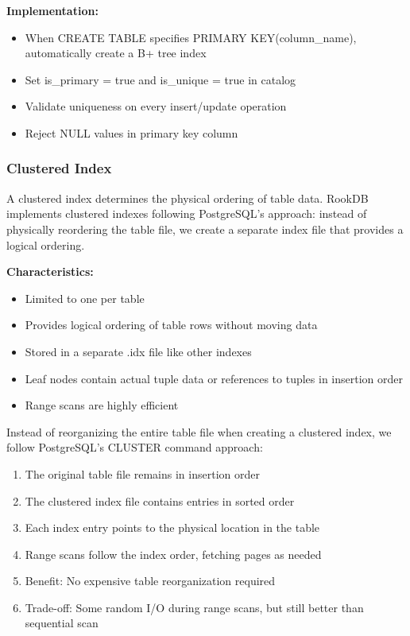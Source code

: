 \documentclass[11pt,a4paper]{article}
\begin{document}
\textbf{Implementation:}
\begin{itemize}
\item When CREATE TABLE specifies PRIMARY KEY(column\_name), automatically create a B+ tree index
\item Set is\_primary = true and is\_unique = true in catalog
\item Validate uniqueness on every insert/update operation
\item Reject NULL values in primary key column
\end{itemize}

\subsubsection{Clustered Index}

A clustered index determines the physical ordering of table data. RookDB implements clustered indexes following PostgreSQL's approach: instead of physically reordering the table file, we create a separate index file that provides a logical ordering.

\textbf{Characteristics:}
\begin{itemize}
\item Limited to one per table
\item Provides logical ordering of table rows without moving data
\item Stored in a separate .idx file like other indexes
\item Leaf nodes contain actual tuple data or references to tuples in insertion order
\item Range scans are highly efficient
\end{itemize}


Instead of reorganizing the entire table file when creating a clustered index, we follow PostgreSQL's CLUSTER command approach:
\begin{enumerate}
\item The original table file remains in insertion order
\item The clustered index file contains entries in sorted order
\item Each index entry points to the physical location in the table
\item Range scans follow the index order, fetching pages as needed
\item Benefit: No expensive table reorganization required
\item Trade-off: Some random I/O during range scans, but still better than sequential scan
\end{enumerate}
\end{document}
